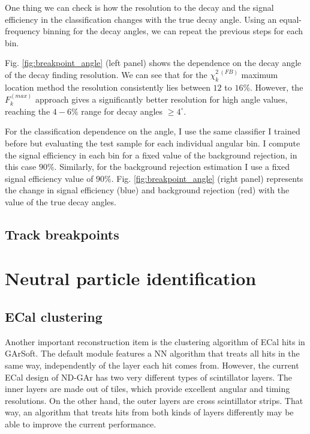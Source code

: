 One thing we can check is how the resolution to the decay and the signal efficiency in the classification changes with the true decay angle. Using an equal-frequency binning for the decay angles, we can repeat the previous steps for each bin.

Fig. \ref{fig:breakpoint_angle} (left panel) shows the dependence on the decay angle of the decay finding resolution. We can see that for the $\chi_{k}^{2 \ (FB)}$ maximum location method the resolution consistently lies between $12$ to $16\%$. However, the $F^{(max)}_{k}$ approach gives a significantly better resolution for high angle values, reaching the $4-6\%$ range for decay angles $\geq 4^{\circ}$.

For the classification dependence on the angle, I use the same classifier I trained before but evaluating the test sample for each individual angular bin. I compute the signal efficiency in each bin for a fixed value of the background rejection, in this case $90\%$. Similarly, for the background rejection estimation I use a fixed signal efficiency value of $90\%$. Fig. \ref{fig:breakpoint_angle} (right panel) represents the change in signal efficiency (blue) and background rejection (red) with the value of the true decay angles.

\subsection{Track breakpoints}

\section{Neutral particle identification}

\subsection{ECal clustering}

Another important reconstruction item is the clustering algorithm of ECal hits in GArSoft. The default module features a NN algorithm that treats all hits in the same way, independently of the layer each hit comes from. However, the current ECal design of ND-GAr has two very different types of scintillator layers. The inner layers are made out of tiles, which provide excellent angular and timing resolutions. On the other hand, the outer layers are cross scintillator strips. That way, an algorithm that treats hits from both kinds of layers differently may be able to improve the current performance.

